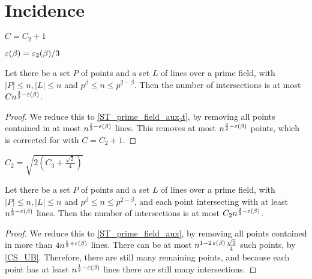 \chapter{Incidence}
\label{chap:inc}

\begin{definition}
    \label{ST_C}
    \leanok
    $C = C_2 + 1$
\end{definition}

\begin{definition}
    \leanok
    $\operatorname{\varepsilon}(\beta) = \operatorname{\varepsilon_2}(\beta) / 3$
\end{definition}

\begin{theorem}
    \label{ST_prime_field}
    \leanok
    Let there be a set $P$ of points and a set $L$ of lines over a prime field, 
    with $|P| \leq n, |L| \leq n$ and $p^\beta \leq n \leq p^{2 - \beta}$.
    Then the number of intersections is at most $ C n^{\frac32 - \operatorname{\varepsilon}(\beta)} $.
\end{theorem}

\begin{proof}
    \leanok
    We reduce this to \ref{ST_prime_field_aux₂t}, by removing all points contained in at most
    $n^{\frac12 - \operatorname{\varepsilon}(\beta)}$ lines. This removes at most $n^{\frac32 - \operatorname{\varepsilon}(\beta)}$
    points, which is corrected for with $C = C_2 + 1$.
\end{proof}

\begin{definition}
    \label{ST_C2}
    \leanok
    $C_2 = \sqrt{2(C_3 + \frac{\sqrt2}4)}$
\end{definition}

\begin{theorem}
    \label{ST_prime_field_aux₂t}
    \leanok
    Let there be a set $P$ of points and a set $L$ of lines over a prime field, 
    with $|P| \leq n, |L| \leq n$ and $p^\beta \leq n \leq p^{2 - \beta}$,
    and each point intersecting with at least $n^{\frac12 - \operatorname{\varepsilon}(\beta)}$ lines.
    Then the number of intersections is at most $C_2 n^{\frac32 - \operatorname{\varepsilon}(\beta)}$.
\end{theorem}

\begin{proof}
    \leanok
    We reduce this to \ref{ST_prime_field_aux}, by removing all points contained in more than 
    $4 n^{\frac12 + \operatorname{\varepsilon}(\beta)}$ lines. There can be at most
    $n^{1 - 2 \operatorname{\varepsilon}(\beta)} \frac{\sqrt2}4$ such points, by \ref{CS_UB}.
    Therefore, there are still many remaining points, and because each point has at least
    $n^{\frac12 - \operatorname{\varepsilon}(\beta)}$ lines there are still many intersections.
\end{proof}

